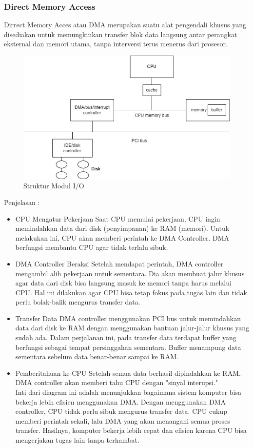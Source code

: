 \documentclass[12pt]{article}
\begin{document}
\subsubsection{Direct Memory Access}
Dirrect Memory Acces atau DMA merupakan suatu alat pengendali khusus yang disediakan untuk memungkinkan transfer blok data langsung antar perangkat eksternal dan memori utama, tanpa interversi terus menerus dari prosesor. \\
\begin{figure}[h]
    \centering
    \includegraphics[width=0.80\linewidth]{b_class/asset/I_O.jpg}
    \caption{Struktur Modul I/O}
    \label{fig:enter-label}
\end{figure}
Penjelasan :
\begin{itemize}
    \item CPU Mengatur Pekerjaan
    Saat CPU memulai pekerjaan, CPU ingin memindahkan data dari disk (penyimpanan) ke RAM (memori). Untuk melakukan ini, CPU akan memberi perintah ke DMA Controller. DMA berfungsi membantu CPU agar tidak terlalu sibuk.
    \item DMA Controller Beraksi
    Setelah mendapat perintah, DMA controller mengambil alih pekerjaan untuk sementara. Dia akan membuat jalur khusus agar data dari disk bisa langsung masuk ke memori tanpa harus melalui CPU. Hal ini dilakukan agar CPU bisa tetap fokus pada tugas lain dan tidak perlu bolak-balik mengurus transfer data.
    \item Transfer Data
    DMA controller menggunakan PCI bus untuk memindahkan data dari disk ke RAM dengan menggunakan bantuan jalur-jalur khusus yang sudah ada. Dalam perjalanan ini, pada transfer data terdapat buffer yang berfungsi sebagai tempat persinggahan sementara. Buffer menampung data sementara sebelum data benar-benar sampai ke RAM.
    \item Pemberitahuan ke CPU
    Setelah semua data berhasil dipindahkan ke RAM, DMA controller akan memberi tahu CPU dengan "sinyal interupsi." \\
    Inti dari diagram ini adalah menunjukkan bagaimana sistem komputer bisa bekerja lebih efisien menggunakan DMA. Dengan menggunakan DMA controller, CPU tidak perlu sibuk mengurus transfer data. CPU cukup memberi perintah sekali, lalu DMA yang akan menangani semua proses transfer. Hasilnya, komputer bekerja lebih cepat dan efisien karena CPU bisa mengerjakan tugas lain tanpa terhambat.
\end{itemize}
\end{document}
